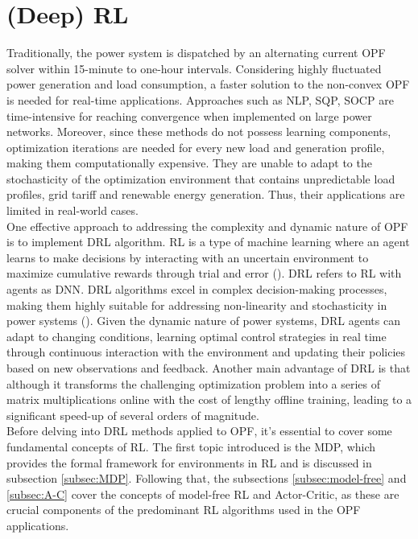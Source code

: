 \section{(Deep) \acrlong{RL}}
Traditionally, the power system is dispatched by an alternating current \gls{OPF} solver within 15-minute to one-hour intervals. Considering highly fluctuated power generation and load consumption, a faster solution to the non-convex \gls{OPF} is needed for real-time applications. Approaches such as \gls{NLP}, \gls{SQP}, \gls{SOCP} are time-intensive for reaching convergence when implemented on large power networks. Moreover, since these methods do not possess learning components, optimization iterations are needed for every new load and generation profile, making them computationally expensive. They are unable to adapt to the stochasticity of the optimization environment that contains unpredictable load profiles, grid tariff and renewable energy generation. Thus, their applications are limited in real-world cases.\\ 
One effective approach to addressing the complexity and dynamic nature of \gls{OPF} is to implement \gls{DRL} algorithm. \acrfull{RL} is a type of machine learning where an agent learns to make decisions by interacting with an uncertain environment to maximize cumulative rewards through trial and error (\cite{sutton2018reinforcement}). \acrfull{DRL} refers to \gls{RL} with agents as \gls{DNN}. \gls{DRL} algorithms excel in complex decision-making processes, making them highly suitable for addressing non-linearity and stochasticity in power systems (\cite{zhang2019deep, chen2022reinforcement}). Given the dynamic nature of power systems, \gls{DRL} agents can adapt to changing conditions, learning optimal control strategies in real time through continuous interaction with the environment and updating their policies based on new observations and feedback. Another main advantage of \gls{DRL} is that although it transforms the challenging optimization problem into a series of matrix multiplications online with the cost of lengthy offline training, leading to a significant speed-up of several orders of magnitude.\\ %
Before delving into \gls{DRL} methods applied to \gls{OPF}, it's essential to cover some fundamental concepts of \gls{RL}. The first topic introduced is the \gls{MDP}, which provides the formal framework for environments in \gls{RL} and is discussed in subsection \ref{subsec:MDP}. Following that, the subsections \ref{subsec:model-free} and \ref{subsec:A-C} cover the concepts of model-free \gls{RL} and Actor-Critic, as these are crucial components of the predominant \gls{RL} algorithms used in the \gls{OPF} applications.


